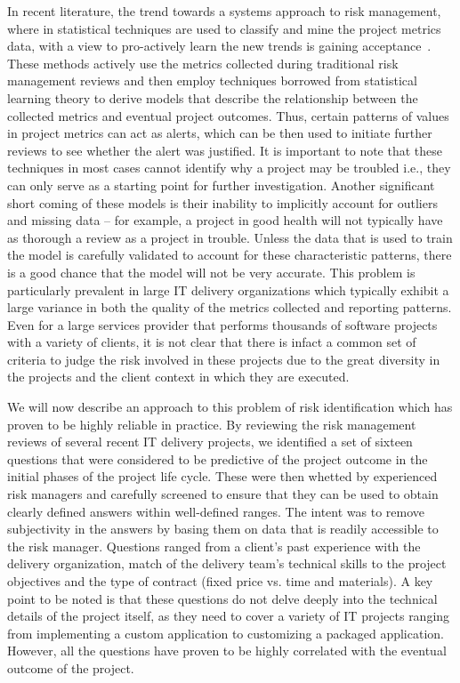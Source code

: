 In recent literature, the trend towards a systems approach to risk management, where in statistical techniques are used to classify and mine the project metrics data, with a view to pro-actively learn the new trends is gaining acceptance~\cite{risk8,risk9,risk10}.  These methods actively use the metrics collected during traditional risk management reviews and then employ techniques borrowed from statistical learning theory to derive models that describe the relationship between the collected metrics and eventual project outcomes. Thus, certain patterns of values in project metrics can act as alerts, which can be then used to initiate further reviews to see whether the alert was justified. It is important to note that these techniques in most cases cannot identify why a project may be troubled i.e., they can only serve as a starting point for further investigation.  Another significant short coming of these models is their inability to implicitly account for outliers and missing data -- for example, a project in good health will not typically have as thorough a review as a project in trouble. Unless the data that is used to train the model is carefully validated to account for these characteristic patterns, there is a good chance that the model will not be very accurate. This problem is particularly prevalent in large IT delivery organizations which typically exhibit a large variance in both the quality of the metrics collected and reporting patterns. Even for a large services provider that performs thousands of software projects with a variety of clients, it is not clear that there is infact a common set of criteria to judge the risk involved in these projects due to the great diversity in the projects and the client context in which they are executed.
 
 We will now describe an approach to this problem of risk identification which has proven to be highly reliable in practice. By reviewing the risk management reviews of several recent IT delivery projects, we identified a set of sixteen questions that were considered to be predictive of the project outcome in the initial phases of the project life cycle. These were then whetted by experienced risk managers and carefully screened to ensure that they can be used to obtain clearly defined answers within well-defined ranges. The intent was to remove subjectivity in the answers by basing them on data that is readily accessible to the risk manager.  Questions ranged from a client's past experience with the delivery organization, match of the delivery team's technical skills to the project objectives and the type of contract (fixed price vs. time and materials).  A key point to be noted is that these questions do not delve deeply into the technical details of the project itself, as they need to cover a variety of IT projects ranging from implementing a custom application to customizing a packaged application. However, all the questions have proven to be highly correlated with the eventual outcome of the project.

